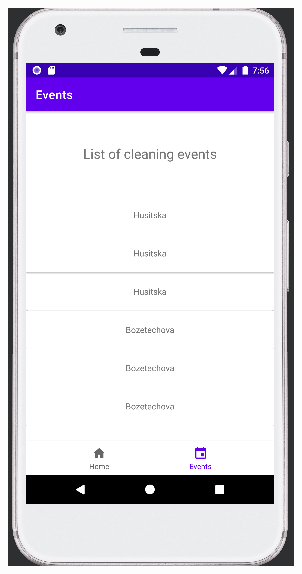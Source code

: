 \documentclass[10pt,xcolor=pdflatex,hyperref={unicode}]{beamer}
\begin{document}
\begin{frame}
\begin{figure}
\begin{minipage}{0.3\textwidth}
        \end{minipage}
        \hfill
        \begin{minipage}{0.3\textwidth}
            \centering
            \includegraphics[width=0.25\paperwidth]{img/ui3.jpg}
        \end{minipage}
        \hfill
    \end{figure}
\end{frame}
\end{document}
